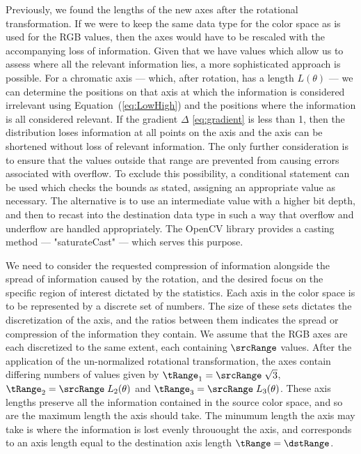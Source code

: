 Previously, we found the lengths of the new axes after the rotational transformation. If we were to keep the same data type for the color space as is used for the RGB values, then the axes would have to be rescaled with the accompanying loss of information. Given that we have values which allow us to assess where all the relevant information lies, a more sophisticated approach is possible. For a chromatic axis --- which, after rotation, has a length $L(\theta)$ --- we can determine the positions on that axis at which the information is considered irrelevant using Equation~(\ref{eq:LowHigh}) and the positions where the information is all considered relevant. If the gradient $ \Delta$ \ref{eq:gradient} is less than 1, then the distribution loses information at all points on the axis and the axis can be shortened without loss of relevant information. The only further consideration is to ensure that the values outside that range are prevented from causing errors associated with overflow. To exclude this possibility, a conditional statement can be used which checks the bounds as stated, assigning an appropriate value as necessary. The alternative is to use an intermediate value with a higher bit depth, and then to recast into the destination data type in such a way that overflow and underflow are handled appropriately. The OpenCV library provides a casting method --- "saturateCast" --- which serves this purpose.

We need to consider the requested compression of information alongside the spread of information caused by the rotation, and the desired focus on the specific region of interest dictated by the statistics. Each axis in the color space is to be represented by a discrete set of numbers. The size of these sets dictates the discretization of the axis, and the ratios between them indicates the spread or compression of the information they contain. We assume that the RGB axes are each discretized to the same extent, each containing $\srcRange$ values. After the application of the un-normalized rotational transformation, the axes contain differing numbers of values given by $\tRange_1 =\srcRange \; \sqrt{3} $, $\tRange_2 = \srcRange \; L_2(\theta) $  and $\tRange_3 = \srcRange \; L_3(\theta)$. These axis lengths preserve all the information contained in the source color space, and so are the maximum length the axis should take. The minumum length the axis may take is where the information is lost evenly throuought the axis, and corresponds to an axis length equal to the destination axis length $\tRange = \dstRange$. 

